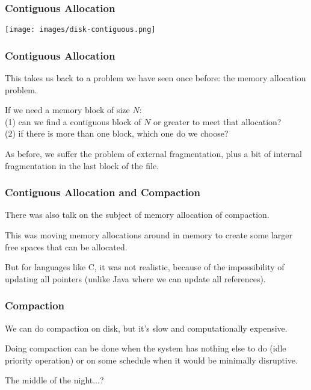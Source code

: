 \begin{frame}
\frametitle{Contiguous Allocation}

\begin{center}
	\texttt{[image: images/disk-contiguous.png]}
\end{center}

\end{frame}

\begin{frame}
\frametitle{Contiguous Allocation}

This takes us back to a problem we have seen once before: the memory allocation problem. 

If we need a memory block of size $N$:\\
\quad (1) can we find a contiguous block of $N$ or greater to meet that allocation?\\
\quad (2) if there is more than one block, which one do we choose? 

As before, we suffer the problem of external fragmentation, plus a bit of internal fragmentation in the last block of the file. 

\end{frame}

\begin{frame}
\frametitle{Contiguous Allocation and Compaction}

There was also talk on the subject of memory allocation of compaction. 

This was moving memory allocations around in memory to create some larger free spaces that can be allocated. 

But for languages like C, it was not realistic, because of the impossibility of updating all pointers (unlike Java where we can update all references). 

\end{frame}

\begin{frame}
\frametitle{Compaction}

We can do compaction on disk, but it's slow and computationally expensive. 

Doing compaction can be done when the system has nothing else to do (idle priority operation) or on some schedule when it would be minimally disruptive.

The middle of the night...?


\end{frame}

